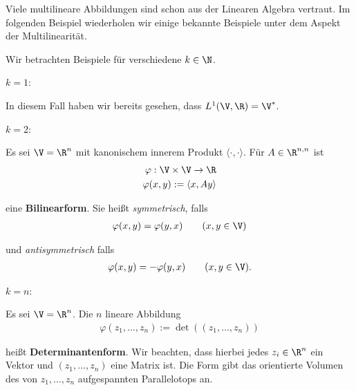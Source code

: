 \par
Viele multilineare Abbildungen sind schon aus der Linearen Algebra vertraut. Im folgenden Beispiel wiederholen wir einige bekannte Beispiele unter dem Aspekt der Multilinearität.
\label{vektoranalysis/multilinear:ex:multi}
\begin{example}{}{}



\par
Wir betrachten Beispiele für verschiedene \(k\in\N\).

\par
\textbf{\(k=1\)}:

\par
In diesem Fall haben wir bereits gesehen, dass \(L^1(\V,\R) = \V^\ast\).

\par
\textbf{\(k=2\)}:

\par
Es sei \(\V=\R^n\) mit kanonischem innerem Produkt \(\langle\cdot,\cdot\rangle\). Für \(A\in\R^{n,n}\) ist
\begin{align*}
\varphi:\V\times \V\to\R\\ 
\varphi(x, y) :=\langle x,A y \rangle
\end{align*}
\par
eine \textbf{Bilinearform}. Sie heißt \emph{symmetrisch},
falls
\begin{align*}
\varphi(x, y) = \varphi( y, x)\qquad (x, y\in \V)
\end{align*}
\par
und \emph{antisymmetrisch} falls
\begin{align*}
\varphi(x, y) = -\varphi( y, x)\qquad (x, y\in \V).
\end{align*}
\par
\textbf{\(k=n\)}:

\par
Es sei \(\V=\R^n\). Die \(n\) lineare Abbildung
\begin{align*}
\varphi(z_1,\ldots,z_n) := \det((z_1,\ldots,z_n))
\end{align*}
\par
heißt \textbf{Determinantenform}. Wir beachten, dass hierbei jedes \(z_i\in\R^n\) ein Vektor und \((z_1,\ldots,z_n)\) eine Matrix ist.
Die Form gibt das orientierte Volumen des von \(z_1,\ldots,z_n\) aufgespannten Parallelotops an.
\end{example}


